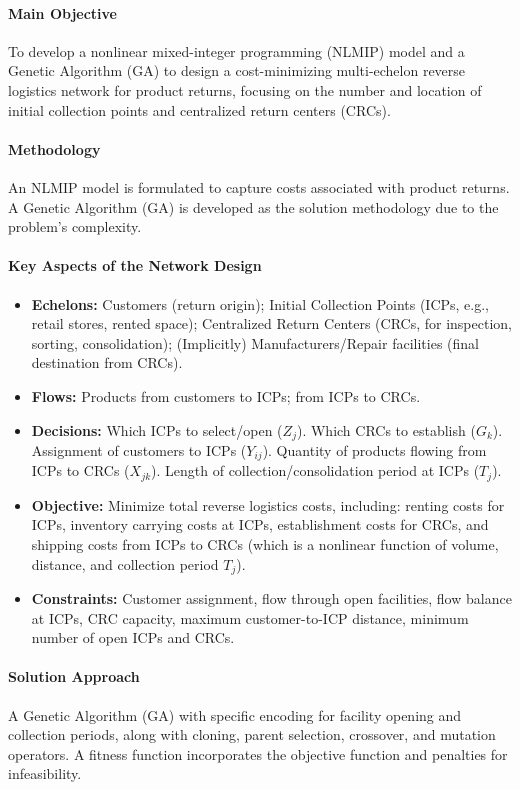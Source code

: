 \paragraph{Main Objective} To develop a nonlinear mixed-integer programming (NLMIP) model and a Genetic Algorithm (GA) to design a cost-minimizing multi-echelon reverse logistics network for product returns, focusing on the number and location of initial collection points and centralized return centers (CRCs).
\paragraph{Methodology} An NLMIP model is formulated to capture costs associated with product returns. A Genetic Algorithm (GA) is developed as the solution methodology due to the problem's complexity.
\paragraph{Key Aspects of the Network Design}
\begin{itemize}
    \item \textbf{Echelons:} Customers (return origin); Initial Collection Points (ICPs, e.g., retail stores, rented space); Centralized Return Centers (CRCs, for inspection, sorting, consolidation); (Implicitly) Manufacturers/Repair facilities (final destination from CRCs).
    \item \textbf{Flows:} Products from customers to ICPs; from ICPs to CRCs.
    \item \textbf{Decisions:} Which ICPs to select/open ($Z_j$). Which CRCs to establish ($G_k$). Assignment of customers to ICPs ($Y_{ij}$). Quantity of products flowing from ICPs to CRCs ($X_{jk}$). Length of collection/consolidation period at ICPs ($T_j$).
    \item \textbf{Objective:} Minimize total reverse logistics costs, including: renting costs for ICPs, inventory carrying costs at ICPs, establishment costs for CRCs, and shipping costs from ICPs to CRCs (which is a nonlinear function of volume, distance, and collection period $T_j$).
    \item \textbf{Constraints:} Customer assignment, flow through open facilities, flow balance at ICPs, CRC capacity, maximum customer-to-ICP distance, minimum number of open ICPs and CRCs.
\end{itemize}
\paragraph{Solution Approach} A Genetic Algorithm (GA) with specific encoding for facility opening and collection periods, along with cloning, parent selection, crossover, and mutation operators. A fitness function incorporates the objective function and penalties for infeasibility.
